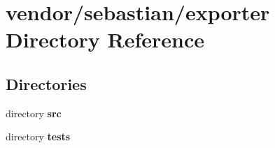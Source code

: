 \section{vendor/sebastian/exporter Directory Reference}
\label{dir_ac761ab88458730e5c37e141af6ae50e}
\subsection*{Directories}
\begin{DoxyCompactItemize}
\item 
directory {\bf src}
\item 
directory {\bf tests}
\end{DoxyCompactItemize}
